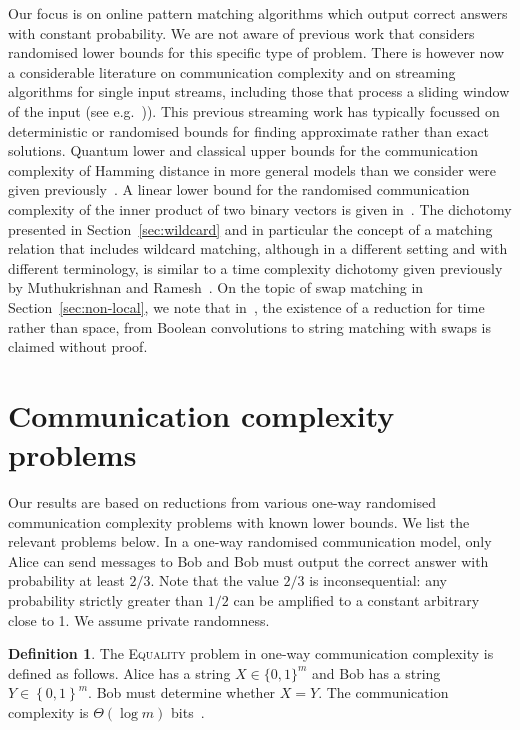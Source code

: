 \documentclass{article}
\newcommand{\equality}{\textsc{Equality}\xspace}
\theoremstyle{plain}
\theoremstyle{definition}
\newtheorem{definition}[theorem]{Definition}
\begin{document}
Our focus is on online pattern matching algorithms which output correct answers with constant probability.  We are not aware of previous work that considers randomised lower bounds for this specific type of problem. There is however now a considerable literature on communication complexity and on streaming algorithms for single input streams, including those that process a sliding window of the input (see e.g.~\cite{DGIM:02})). This previous streaming work has typically focussed on deterministic or randomised bounds for finding approximate rather than exact solutions.  Quantum lower and classical upper bounds for the communication complexity of Hamming distance in more general models than we consider were given previously~\cite{HSZZ:06}. A linear lower bound for the randomised communication complexity of the inner product of two binary vectors is given in~\cite{CG:1985}.   The dichotomy presented in Section~\ref{sec:wildcard} and in particular the concept of  a matching relation that includes wildcard matching, although in a different setting and with different terminology, is similar to a time complexity dichotomy given previously by Muthukrishnan and Ramesh~\cite{MR:95}. On the topic of swap matching in Section~\ref{sec:non-local}, we note that in~\cite{AALLL:00}, the existence of a reduction for time rather than space, from Boolean convolutions to string matching with swaps is claimed without proof.


\section{Communication complexity problems}

Our results are based on reductions from various one-way randomised communication complexity problems with known lower bounds. We list the relevant problems below. In a one-way randomised communication model, only Alice can send messages to Bob and Bob must output the correct answer with probability at least $2/3$. Note that the value $2/3$ is inconsequential: any probability strictly greater than $1/2$ can be amplified to a constant arbitrary close to 1. We assume private randomness.

\begin{definition}
    The \equality problem in one-way communication complexity is defined as follows. Alice has a string $X\in\{0,1\}^{m}$ and Bob has a string $Y\in\left\{ 0,1\right\} ^{m}$. Bob must determine whether $X=Y$. The communication complexity is $\Theta(\log m)$ bits~\cite{Yao:79}.
\end{definition}
\end{document}
